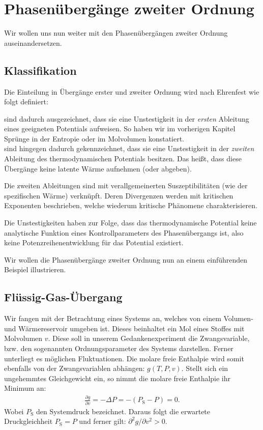 
\chapter{Phasenübergänge zweiter Ordnung\label{sec:phasenuebergaenge zweiter ordnung}}
Wir wollen uns nun weiter mit den Phasenübergängen zweiter Ordnung auseinandersetzen. 
\section{Klassifikation}
Die Einteilung in Übergänge erster und zweiter Ordnung wird nach Ehrenfest wie folgt definiert:
\begin{formal}
     sind dadurch ausgezeichnet, dass sie eine Unstestigkeit in der \emph{ersten} Ableitung eines geeigneten Potentials aufweisen. So haben wir im vorherigen Kapitel Sprünge in der Entropie oder im Molvolumen konstatiert.\\
     sind hingegen dadurch gekennzeichnet, dass sie eine Unstestigkeit in der \emph{zweiten} Ableitung des thermodynamischen Potentials besitzen. Das heißt, dass diese Übergänge keine latente Wärme aufnehmen (oder abgeben).
\end{formal}
Die zweiten Ableitungen sind mit verallgemeinerten Suszeptibilitäten (wie der spezifischen Wärme) verknüpft. Deren Divergenzen werden mit kritischen Exponenten beschrieben, welche wiederum kritische Phänomene charakterisieren. 

Die Unstestigkeiten haben zur Folge, dass das thermodynamische Potential keine analytische Funktion eines Kontrollparameters des Phasenübergangs ist, also keine Potenzreihenentwicklung für das Potential existiert.

Wir wollen die Phasenübergänge zweiter Ordnung nun an einem einführenden Beispiel illustrieren.
\section{Flüssig-Gas-Übergang}
Wir fangen mit der Betrachtung eines Systems an, welches von einem Volumen- und Wärmereservoir umgeben ist. Dieses beinhaltet ein Mol eines Stoffes mit Molvolumen $v$. Diese soll in unserem Gedankenexperiment die Zwangsvariable, bzw. den sogenannten Ordnungsparameter des Systems darstellen. Ferner unterliegt es möglichen Fluktuationen. 
Die molare freie Enthalpie wird somit ebenfalls von der Zwangsvariablen abhängen: $g(T,P,v)$. Stellt sich ein ungehemmtes Gleichgewicht ein, so nimmt die molare freie Enthalpie ihr Minimum an:
\begin{align*}
    \frac{\partial g}{\partial v}=-\Delta P=-\left(P_\mathrm{S}-P\right)=0.
\end{align*}
Wobei $P_\mathrm{S}$ den Systemdruck bezeichnet. Daraus folgt die erwartete Druckgleichheit $P_\mathrm{S}=P$ und ferner gilt: $\partial^2g/\partial v^2>0$.

